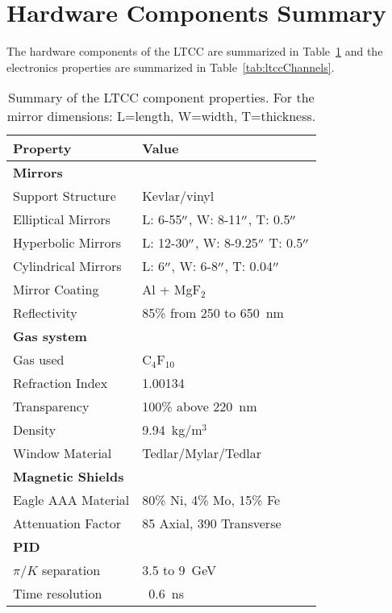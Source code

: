 \section{Hardware Components Summary}

The hardware components of the LTCC are summarized in Table~\ref{tab:ltccProperties} and the electronics
properties are summarized in Table~\ref{tab:ltccChannels}.

\begin{table}[h]
    \small
	\begin{center}
		\begin{tabular}{| l | l |}
			\hline \hline
			Property                 & Value \\
			\hline
			{\bf Mirrors}            &                               \\
			Support Structure        & Kevlar/vinyl                  \\
			Elliptical Mirrors       & L: 6-55$^{\prime\prime}$,  W: 8-11$^{\prime\prime}$,  T: 0.5$^{\prime\prime}$     \\
			Hyperbolic Mirrors       & L: 12-30$^{\prime\prime}$, W: 8-9.25$^{\prime\prime}$ T: 0.5$^{\prime\prime}$  \\
            Cylindrical Mirrors      & L: 6$^{\prime\prime}$, W: 6-8$^{\prime\prime}$, T: 0.04$^{\prime\prime}$   \\
			Mirror Coating           & Al + MgF$_2$                  \\
			Reflectivity             & 85\% from 250 to 650~nm       \\
			{\bf Gas system}         &                               \\
			Gas used                 &   C$_4$F$_{10}$               \\
			Refraction Index         & 1.00134                       \\
			Transparency             & 100\% above 220~nm            \\
			Density                  & 9.94~kg/m$^3$                 \\
			Window Material          & Tedlar/Mylar/Tedlar           \\
			{\bf Magnetic Shields}   &                               \\
			Eagle AAA Material       & 80\% Ni, 4\% Mo, 15\% Fe      \\
			Attenuation Factor       &  85 Axial, 390 Transverse     \\
			{\bf PID}                &                               \\
			$\pi/K$ separation       &  3.5 to 9~GeV                 \\
			Time resolution          &  ~0.6~ns                      \\
			\hline \hline
		\end{tabular}
	\end{center}
        \caption{Summary of the LTCC component properties. For the mirror dimensions: L=length, W=width,
          T=thickness.}
        \label{tab:ltccProperties}
\end{table}

